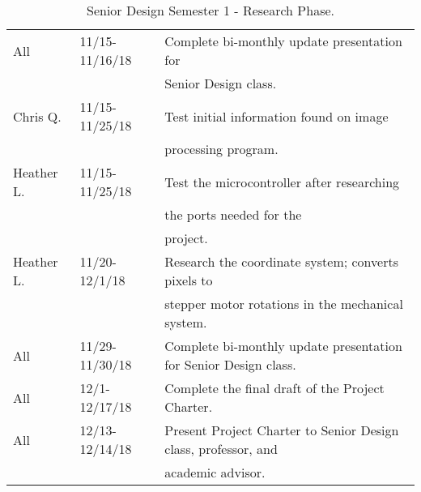 \begin{table} [H]
\begin{tabular}{|l|l|l|}
		All & 11/15-11/16/18 & Complete bi-monthly update presentation for \\
		&& Senior Design class.\\
		\hline
		Chris Q. & 11/15-11/25/18 & Test initial information found on image \\
		&& processing program.\\
		\hline
		Heather L. & 11/15-11/25/18 & Test the microcontroller after researching \\
		&& the ports needed for the \\
		& & project.\\
		\hline
		Heather L. & 11/20-12/1/18 & Research the coordinate system; converts pixels to \\
		& & stepper motor rotations in the mechanical system.\\
		\hline
		All & 11/29-11/30/18 & 
		Complete bi-monthly update presentation for Senior Design class.\\
		\hline
		All & 12/1-12/17/18 & 
		Complete the final draft of the Project Charter.\\
		\hline
		All & 12/13-12/14/18 & 
		Present Project Charter to Senior Design class, professor, and \\
		& & academic advisor.\\
		\hline
\end{tabular} 
\caption{Senior Design Semester 1 - Research Phase.}
\label{table:3}
\end{table}

